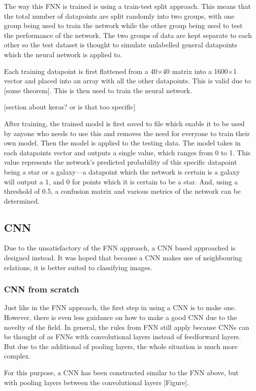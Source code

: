 \documentclass[a4paper,fleqn,usenatbib]{mnras}
\begin{document}
The way this FNN is trained is using a train-test split approach. This means that the total number of datapoints are split randomly into two groups, with one group being used to train the network while the other group being used to test the performance of the network. The two groups of data are kept separate to each other so the test dataset is thought to simulate unlabelled general datapoints which the neural network is applied to.

Each training datapoint is first flattened from a 40$\times$40 matrix into a 1600$\times$1 vector and placed into an array with all the other datapoints. This is valid due to [some theorem]. This is then used to train the neural network. 

[section about keras? or is that too specific]

After training, the trained model is first saved to file which enable it to be used by anyone who needs to use this and removes the need for everyone to train their own model. Then the model is applied to the testing data. The model takes in each datapoints vector and outputs a single value, which ranges from 0 to 1. This value represents the network's predicted probability of this specific datapoint being a star or a galaxy---a datapoint which the network is certain is a galaxy will output a 1, and 0 for points which it is certain to be a star. And, using a threshold of 0.5, a confusion matrix and various metrics of the network can be determined. 
\subsection{CNN}
Due to the unsatisfactory of the FNN approach, a CNN based approached is designed instead. It was hoped that because a CNN makes use of neighbouring relations, it is better suited to classifying images. 
\subsubsection{CNN from scratch}
Just like in the FNN approach, the first step in using a CNN is to make one. However, there is even less guidance on how to make a good CNN due to the novelty of the field. In general, the rules from FNN still apply because CNNs can be thought of as FNNs with convolutional layers instead of feedforward layers. But due to the additional of pooling layers, the whole situation is much more complex. 

For this purpose, a CNN has been constructed similar to the FNN above, but with pooling layers between the convolutional layers [Figure].
\end{document}

